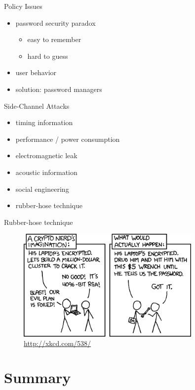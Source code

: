 \documentclass{curs}
\begin{document}
\begin{frame}{Policy Issues}
  \begin{itemize}
    \item password security paradox
      \begin{itemize}
        \item easy to remember
        \item hard to guess
      \end{itemize}
    \item user behavior
    \item solution: password managers
  \end{itemize}
\end{frame}

\begin{frame}{Side-Channel Attacks}
  \begin{itemize}
    \item timing information
    \item performance / power consumption 
    \item electromagnetic leak
    \item acoustic information
    \item social engineering
    \item rubber-hose technique
  \end{itemize}
\end{frame}

\begin{frame}{Rubber-hose technique}
  \begin{figure}
    \centering
    \includegraphics[width=0.8\textwidth]{img/security-wrench.png} \\
    \tiny{\url{http://xkcd.com/538/}}
  \end{figure}
\end{frame}


\section{Summary}
\end{document}
